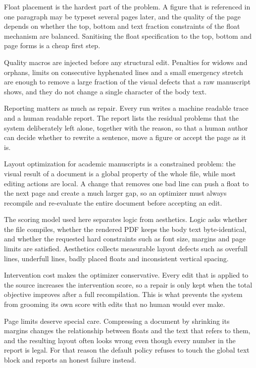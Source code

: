 \documentclass[10pt,a4paper]{article}
\begin{document}
Float placement is the hardest part of the problem. A figure that is referenced in one paragraph may be typeset several pages later, and the quality of the page depends on whether the top, bottom and text fraction constraints of the float mechanism are balanced. Sanitising the float specification to the top, bottom and page forms is a cheap first step.

Quality macros are injected before any structural edit. Penalties for widows and orphans, limits on consecutive hyphenated lines and a small emergency stretch are enough to remove a large fraction of the visual defects that a raw manuscript shows, and they do not change a single character of the body text.

Reporting matters as much as repair. Every run writes a machine readable trace and a human readable report. The report lists the residual problems that the system deliberately left alone, together with the reason, so that a human author can decide whether to rewrite a sentence, move a figure or accept the page as it is.

Layout optimization for academic manuscripts is a constrained problem: the visual result of a document is a global property of the whole file, while most editing actions are local. A change that removes one bad line can push a float to the next page and create a much larger gap, so an optimizer must always recompile and re-evaluate the entire document before accepting an edit.

The scoring model used here separates logic from aesthetics. Logic asks whether the file compiles, whether the rendered PDF keeps the body text byte-identical, and whether the requested hard constraints such as font size, margins and page limits are satisfied. Aesthetics collects measurable layout defects such as overfull lines, underfull lines, badly placed floats and inconsistent vertical spacing.

Intervention cost makes the optimizer conservative. Every edit that is applied to the source increases the intervention score, so a repair is only kept when the total objective improves after a full recompilation. This is what prevents the system from grooming its own score with edits that no human would ever make.

Page limits deserve special care. Compressing a document by shrinking its margins changes the relationship between floats and the text that refers to them, and the resulting layout often looks wrong even though every number in the report is legal. For that reason the default policy refuses to touch the global text block and reports an honest failure instead.
\end{document}
